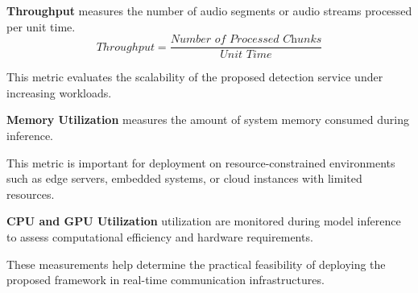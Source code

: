 \textbf{Throughput} measures the number of audio segments or audio streams processed per unit time.
\begin{equation}
Throughput =
\frac{\textit{Number of Processed Chunks}}
{\textit{Unit Time}}
\end{equation}

This metric evaluates the scalability of the proposed detection service under increasing workloads.

\textbf{Memory Utilization} measures the amount of system memory consumed during inference.

This metric is important for deployment on resource-constrained environments such as edge servers, embedded systems, or cloud instances with limited resources.

\textbf{CPU and GPU Utilization} utilization are monitored during model inference to assess computational efficiency and hardware requirements.

These measurements help determine the practical feasibility of deploying the proposed framework in real-time communication infrastructures.